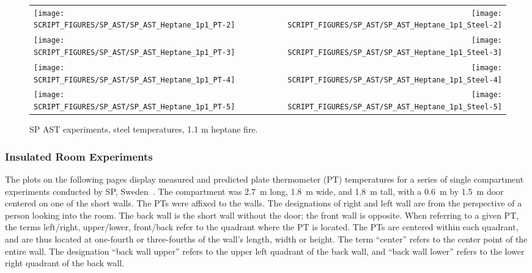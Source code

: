 \begin{figure}[p]
\begin{tabular*}{\textwidth}{l@{\extracolsep{\fill}}r}
\texttt{[image: SCRIPT\_FIGURES/SP\_AST/SP\_AST\_Heptane\_1p1\_PT-2]} &  \texttt{[image: SCRIPT\_FIGURES/SP\_AST/SP\_AST\_Heptane\_1p1\_Steel-2]}  \\
\texttt{[image: SCRIPT\_FIGURES/SP\_AST/SP\_AST\_Heptane\_1p1\_PT-3]} &  \texttt{[image: SCRIPT\_FIGURES/SP\_AST/SP\_AST\_Heptane\_1p1\_Steel-3]}  \\
\texttt{[image: SCRIPT\_FIGURES/SP\_AST/SP\_AST\_Heptane\_1p1\_PT-4]} &  \texttt{[image: SCRIPT\_FIGURES/SP\_AST/SP\_AST\_Heptane\_1p1\_Steel-4]}  \\
\texttt{[image: SCRIPT\_FIGURES/SP\_AST/SP\_AST\_Heptane\_1p1\_PT-5]} &  \texttt{[image: SCRIPT\_FIGURES/SP\_AST/SP\_AST\_Heptane\_1p1\_Steel-5]}
\end{tabular*}
\caption[SP AST experiments, steel temperatures, 1.1 m heptane fire]{SP AST experiments, steel temperatures, 1.1 m heptane fire.}
\label{SP_Heptane_1p1_PT_Steel}
\end{figure}

\clearpage

\subsubsection{Insulated Room Experiments}

The plots on the following pages display measured and predicted plate thermometer (PT) temperatures for a series of single compartment experiments conducted by SP, Sweden~\cite{Sjostrom:SP2016}. The compartment was 2.7~m long, 1.8~m wide, and 1.8~m tall, with a 0.6~m by 1.5~m door centered on one of the short walls. The PTs were affixed to the walls. The designations of right and left wall are from the perspective of a person looking into the room. The back wall is the short wall without the door; the front wall is opposite. When referring to a given PT, the terms left/right, upper/lower, front/back refer to the quadrant where the PT is located. The PTs are centered within each quadrant, and are thus located at one-fourth or three-fourths of the wall's length, width or height. The term ``center'' refers to the center point of the entire wall. The designation ``back wall upper'' refers to the upper left quadrant of the back wall, and ``back wall lower'' refers to the lower right quadrant of the back wall.

